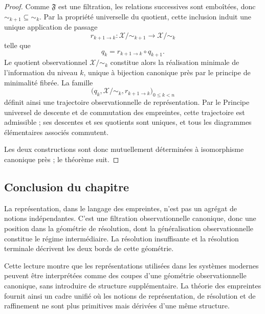 \documentclass[11pt,a4paper]{article}
\begin{document}
\begin{appendices}
\begin{proof}
Comme \(\mathfrak F\) est une filtration, les relations successives sont emboîtées, donc \(\sim_{k+1}\subseteq \sim_k\). Par la propriété universelle du quotient, cette inclusion induit une unique application de passage
\[
r_{k+1\to k}:\mathcal X/{\sim_{k+1}}\longrightarrow \mathcal X/{\sim_k}
\]
telle que
\[
q_k=r_{k+1\to k}\circ q_{k+1}.
\]
Le quotient observationnel \(\mathcal X/{\sim_k}\) constitue alors la réalisation minimale de l'information du niveau \(k\), unique à bijection canonique près par le principe de minimalité fibrée. La famille
\[
\bigl(q_k,\mathcal X/{\sim_k},r_{k+1\to k}\bigr)_{0\le k<n}
\]
définit ainsi une trajectoire observationnelle de représentation. Par le Principe universel de descente et de commutation des empreintes, cette trajectoire est admissible ; ses descentes et ses quotients sont uniques, et tous les diagrammes élémentaires associés commutent.

Les deux constructions sont donc mutuellement déterminées à isomorphisme canonique près ; le théorème suit.
\end{proof}


\subsection{Conclusion du chapitre}

La représentation, dans le langage des empreintes, n'est pas un agrégat de notions indépendantes. C'est une filtration observationnelle canonique, donc une position dans la géométrie de résolution, dont la généralisation observationnelle constitue le régime intermédiaire. La résolution insuffisante et la résolution terminale décrivent les deux bords de cette géométrie.

Cette lecture montre que les représentations utilisées dans les systèmes modernes peuvent être interprétées comme des coupes d'une géométrie observationnelle canonique, sans introduire de structure supplémentaire. La théorie des empreintes fournit ainsi un cadre unifié où les notions de représentation, de résolution et de raffinement ne sont plus primitives mais dérivées d'une même structure.















\end{appendices}
\end{document}
